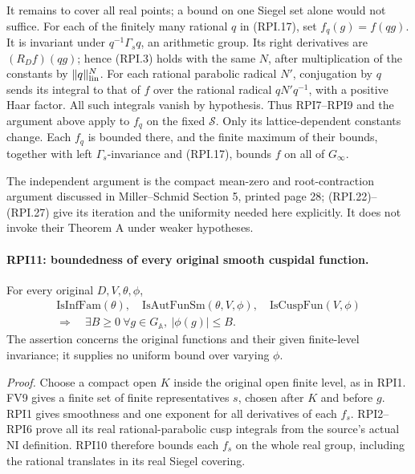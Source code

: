 It remains to cover all real points; a bound on one
Siegel set alone would not suffice.  For each of the
finitely many rational \(q\) in (RPI.17), set
\(f_q(g)=f(qg)\).  It is invariant under
\(q^{-1}\Gamma_s q\), an arithmetic group.
Its right derivatives are \((R_Df)(qg)\); hence
(RPI.3) holds with the same \(N\), after multiplication
of the constants by \(\|q\|_{\rm lin}^{N}\).
For each rational parabolic radical \(N'\), conjugation
by \(q\) sends its integral to that of \(f\) over the
rational radical \(qN'q^{-1}\), with a positive Haar
factor.  All such integrals vanish by hypothesis.
Thus RPI7--RPI9 and the argument above apply to \(f_q\)
on the fixed \(\mathcal S\).  Only its lattice-dependent
constants change.  Each \(f_q\) is bounded there, and the
finite maximum of their bounds, together with left
\(\Gamma_s\)-invariance and (RPI.17), bounds \(f\) on
all of \(G_\infty\).

The independent argument is the compact mean-zero and
root-contraction argument discussed in Miller--Schmid
Section 5, printed page 28; (RPI.22)--(RPI.27) give its
iteration and the uniformity needed here explicitly.
It does not invoke their Theorem A under weaker hypotheses.

\paragraph{RPI11: boundedness of every original smooth cuspidal function.}
\label{claim:RPI11}
For every original \(D,V,\theta,\phi\),
\[
 \begin{gathered}
 \mathrm{IsInfFam}(\theta),\quad
 \mathrm{IsAutFunSm}(\theta,V,\phi),\quad
 \mathrm{IsCuspFun}(V,\phi)\\
 \Longrightarrow\quad
       \exists B\ge0\ \forall g\in G_{\mathbb A},\
                                      |\phi(g)|\le B.
 \end{gathered}
 \tag{RPI.29}
\]
The assertion concerns the original functions and their
given finite-level invariance; it supplies no uniform
bound over varying \(\phi\).

\emph{Proof.}
Choose a compact open \(K\) inside the original open
finite level, as in RPI1.  FV9 gives a finite set of
finite representatives \(s\), chosen after \(K\) and
before \(g\).  RPI1 gives smoothness and one exponent
for all derivatives of each \(f_s\).  RPI2--RPI6 prove
all its real rational-parabolic cusp integrals from
the source's actual \(\mathrm{NI}\) definition.
RPI10 therefore bounds each \(f_s\) on the whole real
group, including the rational translates in its real
Siegel covering.

